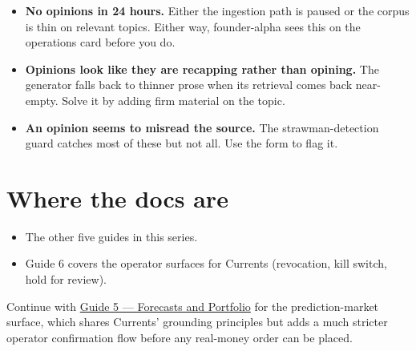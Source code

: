 \documentclass[11pt]{article}
\begin{document}
\begin{itemize}[leftmargin=*,itemsep=0.3em]
  \item \textbf{No opinions in 24 hours.} Either the ingestion path
        is paused or the corpus is thin on relevant topics. Either
        way, founder-alpha sees this on the operations card before
        you do.
  \item \textbf{Opinions look like they are recapping rather than
        opining.} The generator falls back to thinner prose when its
        retrieval comes back near-empty. Solve it by adding firm
        material on the topic.
  \item \textbf{An opinion seems to misread the source.} The
        strawman-detection guard catches most of these but not all.
        Use the  form to flag it.
\end{itemize}

\section{Where the docs are}

\begin{itemize}[leftmargin=*,itemsep=0.2em]
  \item The other five guides in this series.
  \item Guide 6 covers the operator surfaces for Currents
        (revocation, kill switch, hold for review).
\end{itemize}

\begin{nextup}
Continue with \href{05_Forecasts_and_Portfolio.pdf}{Guide 5 ---
Forecasts and Portfolio} for the prediction-market surface, which
shares Currents' grounding principles but adds a much stricter
operator confirmation flow before any real-money order can be placed.
\end{nextup}
\end{document}
